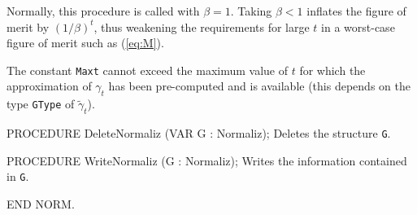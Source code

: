    Normally, this procedure is called with $\beta = 1$.  
   Taking $\beta < 1$ inflates the figure of merit by
   $(1/\beta)^t$, thus weakening the requirements for large $t$ in a 
   worst-case figure of merit such as (\ref{eq:M}).

   The constant {\tt Maxt} cannot exceed 
   the maximum value of $t$ for which the approximation of $\gamma_t$
   has been pre-computed and is available (this depends on the type
   {\tt GType} of $\tilde\gamma_t$).
 \endtab
\code

PROCEDURE DeleteNormaliz (VAR G : Normaliz);
\endcode
 \tab  Deletes the structure {\tt G}.
 \endtab
\code

PROCEDURE WriteNormaliz (G : Normaliz);
\endcode
 \tab  Writes the information contained in {\tt G}.
 \endtab
\code

END NORM.
\endcode

